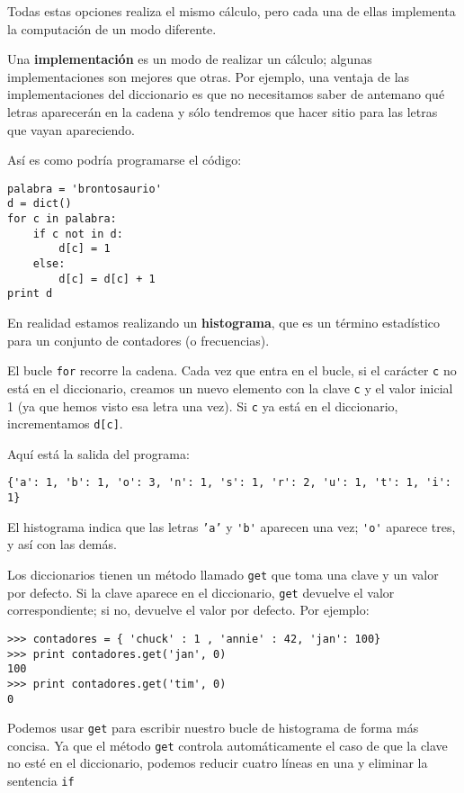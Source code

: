 Todas estas opciones realiza el mismo cálculo, pero cada
una de ellas implementa la computación de un modo diferente.


Una {\bf implementación} es un modo de realizar un cálculo;
algunas implementaciones son mejores que otras. Por ejemplo,
una ventaja de las implementaciones del diccionario es que no
necesitamos saber de antemano qué letras aparecerán en la cadena
y sólo tendremos que hacer sitio para las letras que vayan apareciendo.

Así es como podría programarse el código:

\beforeverb
\begin{verbatim}
palabra = 'brontosaurio'
d = dict()
for c in palabra:
    if c not in d:
        d[c] = 1
    else:
        d[c] = d[c] + 1
print d
\end{verbatim}
\afterverb
%
En realidad estamos realizando un {\bf histograma}, que es un término
estadístico para un conjunto de contadores (o frecuencias).


El bucle {\tt for} recorre
la cadena. Cada vez que entra en el bucle, si el carácter {\tt c} no
está en el diccionario, creamos un nuevo elemento con la clave {\tt c} y el
valor inicial 1 (ya que hemos visto esa letra una vez). Si {\tt c} ya
está en el diccionario, incrementamos {\tt d[c]}.


Aquí está la salida del programa:

\beforeverb
\begin{verbatim}
{'a': 1, 'b': 1, 'o': 3, 'n': 1, 's': 1, 'r': 2, 'u': 1, 't': 1, 'i': 1}
\end{verbatim}
\afterverb
%
El histograma indica que las letras {\tt 'a'} y \verb"'b'"
aparecen una vez;  \verb"'o'" aparece tres, y así con las demás.


Los diccionarios tienen un método llamado {\tt get} que toma una clave
y un valor por defecto. Si la clave aparece en el diccionario,
{\tt get} devuelve el valor correspondiente; si no, devuelve
el valor por defecto. Por ejemplo:

\beforeverb
\begin{verbatim}
>>> contadores = { 'chuck' : 1 , 'annie' : 42, 'jan': 100}
>>> print contadores.get('jan', 0)
100
>>> print contadores.get('tim', 0)
0
\end{verbatim}
\afterverb
%
Podemos usar {\tt get} para escribir nuestro bucle de histograma de forma más concisa.
Ya que el método {\tt get} controla automáticamente el caso de que la clave
no esté en el diccionario, podemos reducir cuatro líneas en una
y eliminar la sentencia {\tt if}

